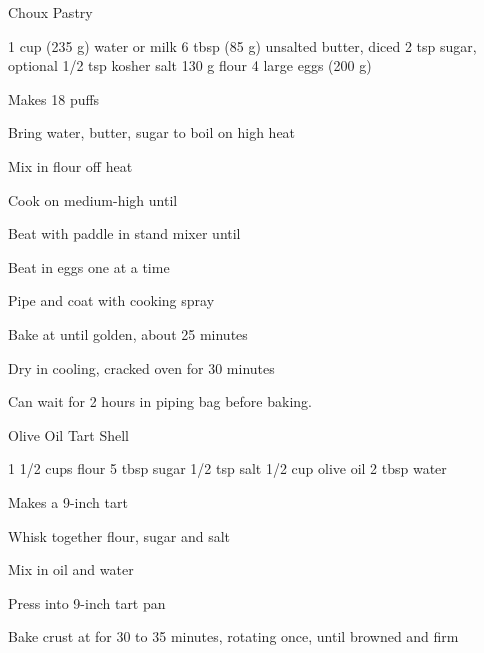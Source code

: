 
\begin{denserecipe}{Choux Pastry}{\vegetarian{}}
\begin{ingredients}
1 cup (235 g) water or milk
6 tbsp (85 g) unsalted butter, diced
2 tsp sugar, optional
1/2 tsp kosher salt
130 g flour
4 large eggs (200 g)
\end{ingredients}
\nextcolumn
Makes 18 puffs
\begin{steps}
    \item Bring water, butter, sugar to boil on high heat
    \item Mix in flour off heat
    \item Cook on medium-high until 
    \item Beat with paddle in stand mixer until 
    \item Beat in eggs one at a time
    \item Pipe and coat with cooking spray
    \item Bake at  until golden, about 25 minutes
    \item Dry in cooling, cracked oven for 30 minutes
\end{steps}
Can wait for 2 hours in piping bag before baking.
\end{denserecipe}

\begin{recipe}{Olive Oil Tart Shell}{\vegetarian{}}
\begin{ingredients}
1 1/2 cups flour
5 tbsp sugar
1/2 tsp salt
1/2 cup olive oil
2 tbsp water
\end{ingredients}
\nextcolumn
Makes a 9-inch tart
\begin{steps}
    \item Whisk together flour, sugar and salt
    \item Mix in oil and water
    \item Press into 9-inch tart pan
    \item Bake crust at  for 30 to 35 minutes, rotating once, until browned and firm
\end{steps}
\end{recipe}

